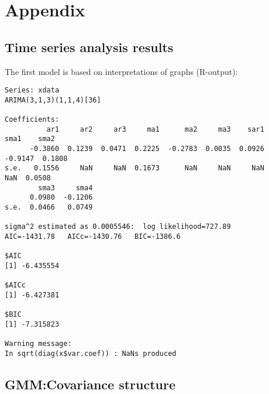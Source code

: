 \section{Appendix}


\subsection{Time series analysis results}
\label{first-R}

The first model is based on interpretations of graphs (R-output):

\begin{minipage}{1.3\textwidth}
\begin{lstlisting}
Series: xdata 
ARIMA(3,1,3)(1,1,4)[36]                    

Coefficients:
          ar1     ar2     ar3     ma1      ma2     ma3    sar1     sma1    sma2
      -0.3860  0.1239  0.0471  0.2225  -0.2783  0.0035  0.0926  -0.9147  0.1808
s.e.   0.1556     NaN     NaN  0.1673      NaN     NaN     NaN      NaN  0.0508
        sma3     sma4
      0.0980  -0.1206
s.e.  0.0466   0.0749

sigma^2 estimated as 0.0005546:  log likelihood=727.89
AIC=-1431.78   AICc=-1430.76   BIC=-1386.6

$AIC
[1] -6.435554

$AICc
[1] -6.427381

$BIC
[1] -7.315823

Warning message:
In sqrt(diag(x$var.coef)) : NaNs produced
\end{lstlisting}
\end{minipage}
\subsection{GMM:Covariance structure}
\label{GMM-covariance-appendix}
